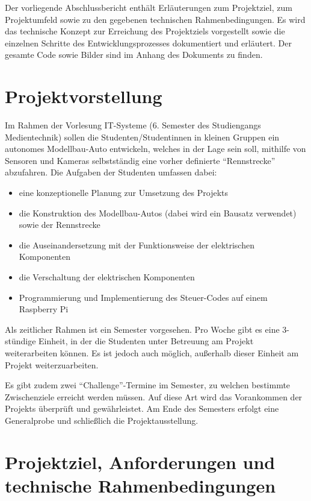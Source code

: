 \documentclass[a4paper, 12pt]{scrartcl}
\begin{document}
Der vorliegende Abschlussbericht enthält Erläuterungen zum Projektziel, zum Projektumfeld sowie zu den gegebenen technischen Rahmenbedingungen. Es wird das technische Konzept zur Erreichung des Projektziels vorgestellt sowie die einzelnen Schritte des Entwicklungsprozesses dokumentiert und erläutert. Der gesamte Code sowie Bilder sind im Anhang des Dokuments zu finden.

\section{Projektvorstellung}

Im Rahmen der Vorlesung IT-Systeme (6. Semester des Studiengangs Medientechnik) sollen die Studenten/Studentinnen in kleinen Gruppen ein autonomes Modellbau-Auto entwickeln, welches in der Lage sein soll, mithilfe von Sensoren und Kameras selbstständig eine vorher definierte “Rennstrecke” abzufahren. Die Aufgaben der Studenten umfassen dabei:


\begin{itemize}
	\item eine konzeptionelle Planung zur Umsetzung des Projekts
	\item die Konstruktion des Modellbau-Autos (dabei wird ein Bausatz verwendet) sowie der Rennstrecke
	\item die Auseinandersetzung mit der Funktionsweise der elektrischen Komponenten
	\item die Verschaltung der elektrischen Komponenten
	\item Programmierung und Implementierung des Steuer-Codes auf einem Raspberry Pi
\end{itemize}


Als zeitlicher Rahmen ist ein Semester vorgesehen. Pro Woche gibt es eine 3-stündige Einheit, in der die Studenten unter Betreuung am Projekt weiterarbeiten können. Es ist jedoch auch möglich, außerhalb dieser Einheit am Projekt weiterzuarbeiten.

Es gibt zudem zwei “Challenge”-Termine im Semester, zu welchen bestimmte Zwischenziele erreicht werden müssen. Auf diese Art wird das Vorankommen der Projekts überprüft und gewährleistet. Am Ende des Semesters erfolgt eine Generalprobe und schließlich die Projektausstellung.

\section{Projektziel, Anforderungen und technische Rahmenbedingungen}
\end{document}
